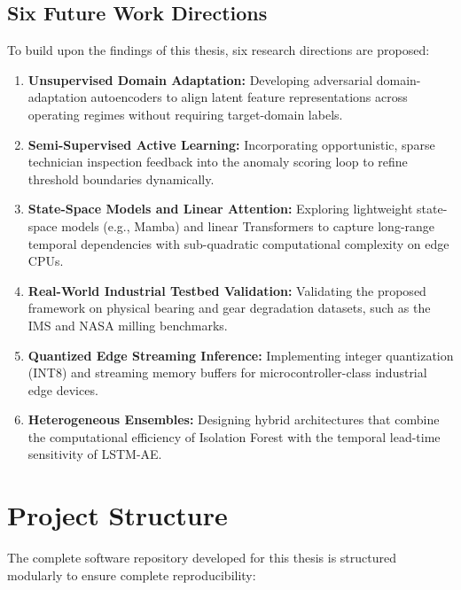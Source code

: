 \documentclass[12pt,a4paper,oneside]{report}
\begin{document}
\section{Six Future Work Directions}
To build upon the findings of this thesis, six research directions are proposed:
\begin{enumerate}
    \item \textbf{Unsupervised Domain Adaptation:} Developing adversarial domain-adaptation autoencoders to align latent feature representations across operating regimes without requiring target-domain labels.
    \item \textbf{Semi-Supervised Active Learning:} Incorporating opportunistic, sparse technician inspection feedback into the anomaly scoring loop to refine threshold boundaries dynamically.
    \item \textbf{State-Space Models and Linear Attention:} Exploring lightweight state-space models (e.g., Mamba) and linear Transformers to capture long-range temporal dependencies with sub-quadratic computational complexity on edge CPUs.
    \item \textbf{Real-World Industrial Testbed Validation:} Validating the proposed framework on physical bearing and gear degradation datasets, such as the IMS and NASA milling benchmarks.
    \item \textbf{Quantized Edge Streaming Inference:} Implementing integer quantization (INT8) and streaming memory buffers for microcontroller-class industrial edge devices.
    \item \textbf{Heterogeneous Ensembles:} Designing hybrid architectures that combine the computational efficiency of Isolation Forest with the temporal lead-time sensitivity of LSTM-AE.
\end{enumerate}

\newpage



\appendix

\chapter{Project Structure}
The complete software repository developed for this thesis is structured modularly to ensure complete reproducibility:
\end{document}
